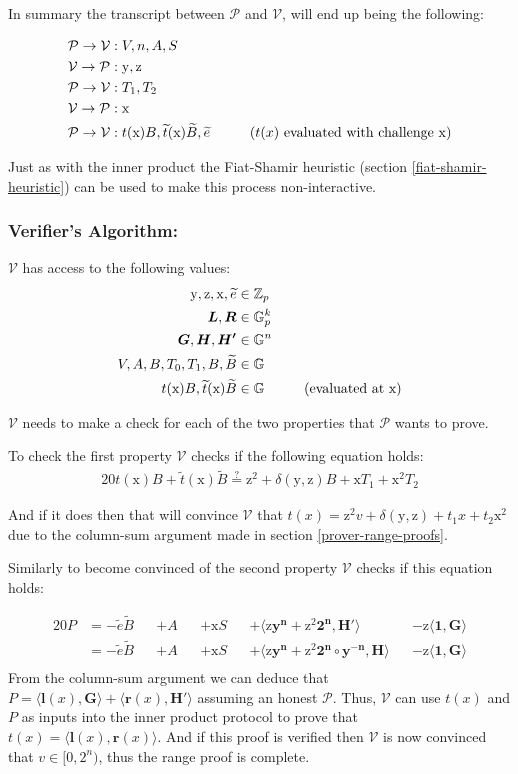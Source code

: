 \documentclass{article}
\newcommand{\eq}[1]{\begin{alignat*}{20}#1\end{alignat*}}
\newcommand{\eqn}[2]{\begin{equation}\label{#1}\begin{split}#2\end{split}\end{equation}}
\renewcommand{\vec}[1]{\boldsymbol{#1}}
\newcommand{\ran}[1]{\mathrm{#1}}
\newcommand{\vecran}[1]{\mathbf{#1}}
\newcommand{\V}{\mathcal{V}}
\renewcommand{\P}{\mathcal{P}}
\newcommand{\G}{\mathbb{G}}
\newcommand{\Z}{\mathbb{Z}}
\newcommand{\dotp}[2]{\langle #1, #2 \rangle}
\newcommand{\blind}[1]{\widetilde{#1}}
\newcommand{\bt}{\blind{t}}
\newcommand{\bB}{\blind{B}}
\newcommand{\be}{\blind{e}}
\begin{document}
In summary the transcript between $\P$ and $\V$, will end up being
the following:

\eq{
	\P \rightarrow \V &: V, n, A, S \\
	\V \rightarrow \P &: \ran{y}, \ran{z} \\
	\P \rightarrow \V &: T_1, T_2 \\
	\V \rightarrow \P &: \ran{x} \\
	\P \rightarrow \V &: t(\ran{x})B, \bt(\ran{x})\bB, \be \hspace*{1cm}\text{($t(x)$ evaluated with challenge $\ran{x}$)}\\
}

Just as with the inner product the Fiat-Shamir heuristic
(section \ref{fiat-shamir-heuristic}) can be used to make this process
non-interactive.

\subsubsection{Verifier's Algorithm:} \label{verifier-range-proof}

$\V$ has access to the following values:
\eqn{range-def1-ver}{
	\ran{y}, \ran{z}, \ran{x}, \be &\in \Z_p \\
	\vec{L}, \vec{R} &\in \G_p^{k} \\
	\vec{G}, \vec{H}, \vec{H'} &\in \G^n \\
	V, A, B, T_0, T_1, B, \bB &\in \G \\
	t(\ran{x})B, \bt(\ran{x})\bB &\in \G \hspace*{1cm} \text{(evaluated at x)}
}

$\V$ needs to make a check for each of the two properties that $\P$
wants to prove.

To check the first property $\V$ checks if the following
equation holds:
\eq{
	t(\ran{x})B + \bt(\ran{x})\bB \stackrel{?}{=} \ran{z^2} + \delta(\ran{y},\ran{z})B + \ran{x}T_1 + \ran{x^2}T_2
}

And if it does then that will convince $\V$ that $t(x) = \ran{z^2}v +
\delta(\ran{y},\ran{z}) + t_1x + t_2\ran{x^2}$ due to the column-sum
argument made in section \ref{prover-range-proofs}.

\newpage

Similarly to become convinced of the second property $\V$ checks if
this equation holds:

\eq{
	P &= -\be\bB &&+ A &&+ \ran{x}S &&+ \dotp{\ran{z}\vecran{y}^{\vecran{n}} + \ran{z^2}\vec{2^n}}{\vec{H'}} &&- \ran{z}\dotp{\vec{1}}{\vec{\vec{G}}} \\
	&= -\be\bB &&+ A &&+ \ran{x}S &&+ \dotp{\ran{z}\vecran{y}^{\vecran{n}} + \ran{z^2}\vec{2^n}\circ\vecran{y^{-n}}}{\vec{H}} &&- \ran{z}\dotp{\vec{1}}{\vec{G}} \\
}
From the column-sum argument we can deduce that $P =
\dotp{\vec{l}(x)}{\vec{G}} + \dotp{\vec{r}(x)}{\vec{H'}}$
assuming an honest $\P$. Thus, $\V$ can use $t(x)$ and $P$ as
inputs into the inner product protocol to prove that $ t(x) =
\dotp{\vec{l}(x)}{\vec{r}(x)}$. And if this proof is verified then
$\V$ is now convinced that $v\in [0,2^n)$, thus the range proof is 
complete.
\end{document}
